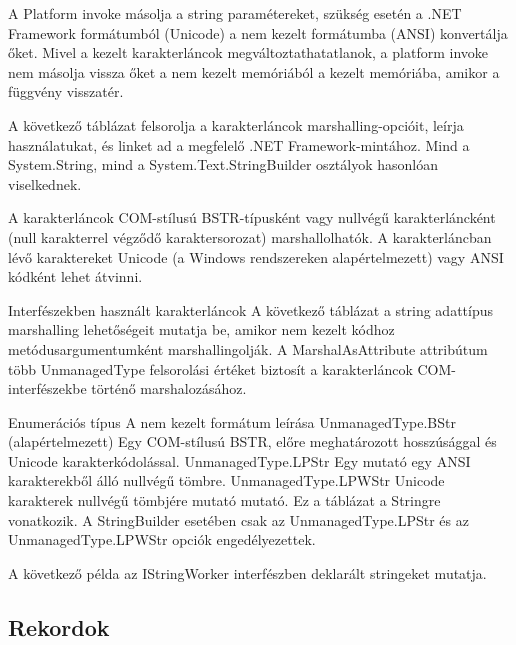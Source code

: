 \documentclass[tocnopagenum]{thesis-ekf}
\theoremstyle{definition}
\theoremstyle{remark}
\begin{document}
		A Platform invoke másolja a string paramétereket, szükség esetén a .NET Framework formátumból (Unicode) a nem kezelt formátumba (ANSI) konvertálja őket. Mivel a kezelt karakterláncok megváltoztathatatlanok, a platform invoke nem másolja vissza őket a nem kezelt memóriából a kezelt memóriába, amikor a függvény visszatér.
		
		A következő táblázat felsorolja a karakterláncok marshalling-opcióit, leírja használatukat, és linket ad a megfelelő .NET Framework-mintához.
		Mind a System.String, mind a System.Text.StringBuilder osztályok hasonlóan viselkednek.
		
		A karakterláncok COM-stílusú BSTR-típusként vagy nullvégű karakterláncként (null karakterrel végződő karaktersorozat) marshallolhatók. A karakterláncban lévő karaktereket Unicode (a Windows rendszereken alapértelmezett) vagy ANSI kódként lehet átvinni.
		
		Interfészekben használt karakterláncok
		A következő táblázat a string adattípus marshalling lehetőségeit mutatja be, amikor nem kezelt kódhoz metódusargumentumként marshallingolják. A MarshalAsAttribute attribútum több UnmanagedType felsorolási értéket biztosít a karakterláncok COM-interfészekbe történő marshalozásához.
		
		Enumerációs típus A nem kezelt formátum leírása
		UnmanagedType.BStr (alapértelmezett) Egy COM-stílusú BSTR, előre meghatározott hosszúsággal és Unicode karakterkódolással.
		UnmanagedType.LPStr Egy mutató egy ANSI karakterekből álló nullvégű tömbre.
		UnmanagedType.LPWStr Unicode karakterek nullvégű tömbjére mutató mutató.
		Ez a táblázat a Stringre vonatkozik. A StringBuilder esetében csak az UnmanagedType.LPStr és az UnmanagedType.LPWStr opciók engedélyezettek.
		
		A következő példa az IStringWorker interfészben deklarált stringeket mutatja.
		\cite{marshalling_strings}
	\subsection{Rekordok}
\end{document}
